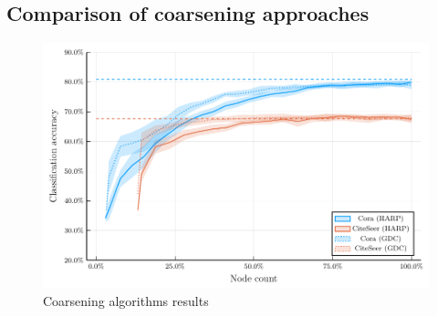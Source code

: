 
\subsection{Comparison of coarsening approaches}

\begin{figure}
  \centering
  \includegraphics[width=\linewidth]{images/coarsening-algorithms/coarsening-algorithms.pdf}
  \caption{Coarsening algorithms results}
  \label{fig:coarsening-algorithms}
\end{figure}
